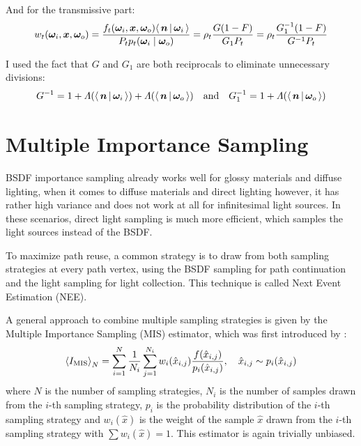 And for the transmissive part:
\begin{equation}
    \begin{aligned}
        w_t(\wi, \vec{x}, \wo)
        = \frac{f_t(\wi, \vec{x}, \wo) \NdotL}{P_t p_t(\wi \mid \wo)}
        = \rho_t \frac{G (1 - F)}{G_1 P_t}
        = \rho_t \frac{G_1^{-1} (1 - F)}{G^{-1} P_t}
    \end{aligned}
\end{equation}

I used the fact that $G$ and $G_1$ are both reciprocals to eliminate unnecessary divisions:
\begin{equation}
    \begin{aligned}
        G^{-1} = 1 + \Lambda(\NdotL) + \Lambda(\NdotV)\quad \text{and} \quad
        G_1^{-1} = 1 + \Lambda(\NdotV)
    \end{aligned}
\end{equation}

\section{Multiple Importance Sampling}
\label{sec:mis}

BSDF importance sampling already works well for glossy materials and diffuse lighting, when it comes to diffuse materials and direct lighting however, it has rather high variance and does not work at all for infinitesimal light sources.
In these scenarios, direct light sampling is much more efficient, which samples the light sources instead of the BSDF.

To maximize path reuse, a common strategy is to draw from both sampling strategies at every path vertex, using the BSDF sampling for path continuation and the light sampling for light collection.
This technique is called Next Event Estimation (NEE).

A general approach to combine multiple sampling strategies is given by the Multiple Importance Sampling (MIS) estimator, which was first introduced by \textcite{veach1997}:
\begin{equation}
    \estimator{I_\mathrm{MIS}} = \sum_{i=1}^{N} \frac{1}{N_i} \sum_{j=1}^{N_i} w_i(\hat{x}_{i,j}) \frac{f(\hat{x}_{i,j})}{p_i(\hat{x}_{i,j})}, \quad \hat{x}_{i,j} \sim p_i(\hat{x}_{i,j})
\end{equation}
where $N$ is the number of sampling strategies, $N_i$ is the number of samples drawn from the $i$-th sampling strategy, $p_i$ is the probability distribution of the $i$-th sampling strategy and $w_i(\hat{x})$ is the weight of the sample $\hat{x}$ drawn from the $i$-th sampling strategy with $\sum w_i(\hat{x}) = 1$.
This estimator is again trivially unbiased.

